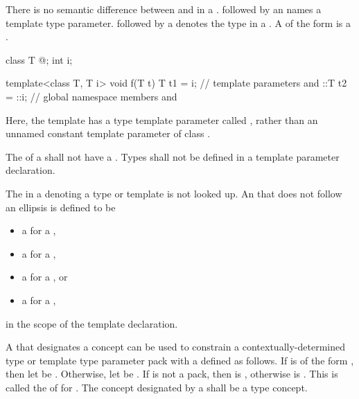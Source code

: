 \pnum
There is no semantic difference between
and
in a
.
followed by an
names a template type parameter.
followed by a
denotes the type in a
.
A  of the form
  is a .
\begin{example}
\begin{codeblock}
class T { @\commentellip@ };
int i;

template<class T, T i> void f(T t) {
  T t1 = i;         // template parameters  and 
  ::T t2 = ::i;     // global namespace members  and 
}
\end{codeblock}
Here, the template  has a type template parameter
called , rather than an unnamed constant
template parameter of class .
\end{example}
The  of a 
shall not have a .
Types shall not be defined in a template parameter
declaration.

\pnum
The  in
a  denoting a type or template
is not looked up.
An  that does not follow an ellipsis
is defined to be
\begin{itemize}
\item
a  for a ,
\item
a  for a ,
\item
a  for a , or
\item
a  for a ,
\end{itemize}
in the scope of the template declaration.

\pnum
A   that designates a concept 
can be used to constrain a
contextually-determined type or template type parameter pack 
with a   defined as follows.
If  is of the form ,
then let  be .
Otherwise, let  be .
If  is not a pack,
then  is ,
otherwise  is .
This   is called the
of  for .
The concept designated by a 
shall be a type concept.

